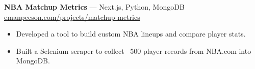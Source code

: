 
\textbf{NBA Matchup Metrics} — Next.js, Python, MongoDB \\
\href{https://emanpecson.com/projects/matchup-metrics}{emanpecson.com/projects/matchup-metrics}
\begin{itemize}[leftmargin=*, nosep]
  \item Developed a tool to build custom NBA lineups and compare player stats.
  \item Built a Selenium scraper to collect ~500 player records from NBA.com into MongoDB.
\end{itemize}
